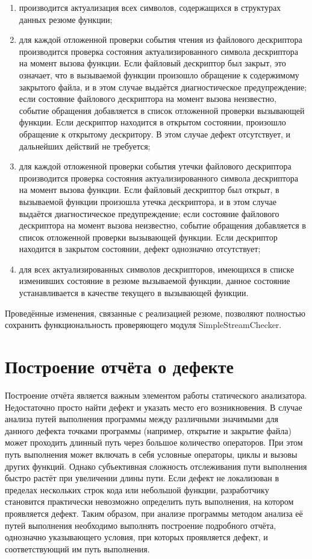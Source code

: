 \begin{enumerate}
 \item производится актуализация всех символов, содержащихся в структурах данных резюме функции;
 \item для каждой отложенной проверки события чтения из файлового дескриптора производится проверка состояния актуализированного символа дескриптора на момент вызова функции. Если файловый дескриптор был закрыт, это означает, что в вызываемой функции произошло обращение к содержимому закрытого файла, и в этом случае выдаётся диагностическое предупреждение; если состояние файлового дескриптора на момент вызова неизвестно, событие обращения добавляется в список отложенной проверки вызывающей функции. Если дескриптор находится в открытом состоянии, произошло обращение к открытому дескритору. В этом случае дефект отсутствует, и дальнейших действий не требуется;
 \item для каждой отложенной проверки события утечки файлового дескриптора производится проверка состояния актуализированного символа дескриптора на момент вызова функции. Если файловый дескриптор был открыт, в вызываемой функции произошла утечка дескриптора, и в этом случае выдаётся диагностическое предупреждение; если состояние файлового дескриптора на момент вызова неизвестно, событие обращения добавляется в список отложенной проверки вызывающей функции. Если дескриптор находится в закрытом состоянии, дефект однозначно отсутствует;
 \item для всех актуализированных символов дескрипторов, имеющихся в списке изменивших состояние в резюме вызываемой функции, данное состояние устанавливается в качестве текущего в вызывающей функции.
\end{enumerate}

Проведённые изменения, связанные с реализацией резюме, позволяют полностью сохранить функциональность проверяющего модуля SimpleStreamChecker.

\section{Построение отчёта о дефекте}

Построение отчёта является важным элементом работы статического анализатора. Недостаточно просто найти дефект и указать место его возникновения. В случае анализа путей выполнения программы между различными значимыми для данного дефекта точками программы (например, открытие и закрытие файла) может проходить длинный путь через большое количество операторов. При этом путь выполнения может включать в себя условные операторы, циклы и вызовы других функций. Однако субъективная сложность отслеживания пути выполнения быстро растёт при увеличении длины пути. Если дефект не локализован в пределах нескольких строк кода или небольшой функции, разработчику становится практически невозможно определить путь выполнения, на котором проявляется дефект. Таким образом, при анализе программы методом анализа её путей выполнения необходимо выполнять построение подробного отчёта, однозначно указывающего условия, при которых проявляется дефект, и соответствующий им путь выполнения.

